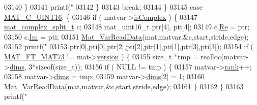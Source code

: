 \begin{DoxyCode}
{{{{{{{{{{{{{{{{{{{{{{{{{{{{{{{{{{{{{{{{{{{{{{{03140                         \}
03141                         printf(\textcolor{stringliteral}{"%
03142                     \}
03143                     \textcolor{keywordflow}{break};
03144                 \}
03145                 \textcolor{keywordflow}{case} \hyperlink{group___m_a_t_ggad4d60ae7b709fc81bfd744fb4c857c40a8bede21dbf6c1edc0bbccc1481bccae7}{MAT\_C\_UINT16}: \{
03146                     \textcolor{keywordflow}{if} ( matvar->\hyperlink{group___m_a_t_aeb03b3a69f108dc05470b00443a43739}{isComplex} ) \{
03147                         \hyperlink{group___m_a_t_structmat__complex__split__t}{mat\_complex\_split\_t} c;
03148                         mat\_uint16\_t ptr[4], pti[4];
03149                         c.\hyperlink{group___m_a_t_a484a93607508adac2bce53a0252e0325}{Re} = ptr;
03150                         c.\hyperlink{group___m_a_t_a7182d10b0d3598415887376065440946}{Im} = pti;
03151                         \hyperlink{group___m_a_t_ga1845000f4fc6252ec5ff11c4b9f0759f}{Mat\_VarReadData}(mat,matvar,&c,start,stride,edge);
03152                         printf(\textcolor{stringliteral}{"%
03153                             ptr[0],pti[0],ptr[2],pti[2],ptr[1],pti[1],ptr[3],pti[3]);
03154                         \textcolor{keywordflow}{if} ( \hyperlink{group___m_a_t_ggad03442b8378999189d510e3745c702b7a765c5d1d5038947646260dc82483517e}{MAT\_FT\_MAT73} != mat->\hyperlink{struct__mat__t_a729c2bc0afc97485057a5af425635b1a}{version} ) \{
03155                             \textcolor{keywordtype}{size\_t} *tmp = realloc(matvar->\hyperlink{group___m_a_t_a8e01234e1c862ce3472bb37f5a09b92c}{dims}, 3*\textcolor{keyword}{sizeof}(\textcolor{keywordtype}{size\_t}));
03156                             \textcolor{keywordflow}{if} ( NULL != tmp ) \{
03157                                 matvar->\hyperlink{group___m_a_t_a84ba70c96ded13cc555fa75b768d9921}{rank}++;
03158                                 matvar->\hyperlink{group___m_a_t_a8e01234e1c862ce3472bb37f5a09b92c}{dims} = tmp;
03159                                 matvar->\hyperlink{group___m_a_t_a8e01234e1c862ce3472bb37f5a09b92c}{dims}[2] = 1;
03160                                 \hyperlink{group___m_a_t_ga1845000f4fc6252ec5ff11c4b9f0759f}{Mat\_VarReadData}(mat,matvar,&c,start,stride,edge);
03161                             \}
03162                         \}
03163                         printf(\textcolor{stringliteral}{"%
}}}}}}}}}}}}}}}}}}}}}}}}}}}}}}}}}}}}}}}}}}}}}}}}}}
\end{DoxyCode}
